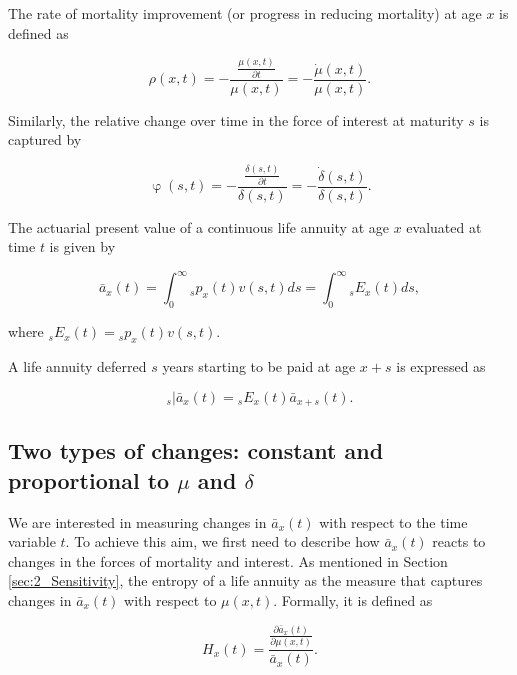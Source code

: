 \documentclass[12pt]{article}
\begin{document}
The rate of mortality improvement (or progress in reducing mortality) at age \(x\) is defined as

\begin{equation} \label{eq:rho}
\rho(x,t)=-\frac{\frac{\mu(x,t)}{\partial t}}{\mu(x,t)} = - \frac{\dot{\mu}(x,t)}{\mu(x,t)}.
\end{equation}

Similarly, the relative change over time in the force of interest at maturity $s$ is captured by 

\begin{equation} \label{eq:phi}
\upvarphi(s,t)=-\frac{\frac{\delta(s,t)}{\partial t}}{\delta(s,t)} = -\frac{\dot{\delta}(s,t)}{\delta(s,t)}.
\end{equation}

The actuarial present value of a continuous life annuity at age $x$ evaluated at time $t$ is given by

\begin{equation}\label{eq:Annuity}
\bar{a}_x(t) = \int_0^\infty {}_sp_x(t) {v}(s,t)ds = \int_0^\infty {}_sE_x(t) ds,
\end{equation}

where ${}_sE_x(t)={}_sp_x(t) {v}(s,t)$. 

A life annuity deferred $s$ years starting to be paid at age $x+s$ is expressed as

\begin{equation}\label{eq:DefAnnuity}
{}_s|\bar{a}_x(t) = {}_sE_x(t) \bar{a}_{x+s}(t).
\end{equation}


\subsection{Two types of changes: constant and proportional to $\mu$ and $\delta$}


We are interested in measuring changes in $\bar{a}_x(t)$ with respect to the time variable $t$. To achieve this aim, we first need to describe how $\bar{a}_x(t)$ reacts to changes in the forces of mortality and interest. As mentioned in Section \ref{sec:2_Sensitivity}, the entropy of a life annuity as the measure that captures changes in $\bar{a}_x(t)$ with respect to $\mu(x,t)$. Formally, it is defined as 

\begin{equation}\label{eq:EntropyGeneral}
{H}_{x}(t) = \frac{ \frac{\partial \bar{a}_x(t) }{\partial \mu(x,t)}}{\bar{a}_x(t)}.
\end{equation}
\end{document}
